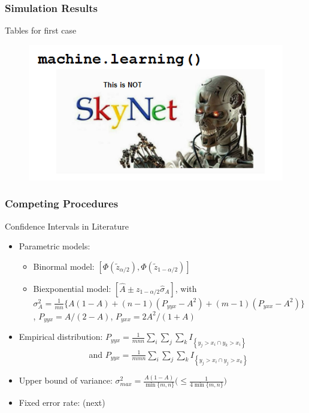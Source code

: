 \documentclass{beamer}
\begin{document}

\begin{frame}
\frametitle{Simulation Results}

Tables for first case
\begin{figure}
    \includegraphics[scale =  0.75 ]{Figs/ThisIsNotSkyNetLogo.png}
\end{figure}

\end{frame}



\begin{frame}
\frametitle{Competing Procedures}

Confidence Intervals in Literature
\begin{itemize}

    \item Parametric models:
    \begin{itemize}
        \item Binormal model: $[\Phi(\tilde{z}_{\alpha/2}), \Phi(\tilde{z}_{1-\alpha/2})]$
        \item Biexponential model: $[\hat{A} \pm  z_{1-\alpha/2} \hat{\sigma}_A]$, with \\
        $\sigma^2_A = \frac{1}{mn} \{ A(1 - A) + (n - 1)(P_{yyx} - A^2) + (m - 1)(P_{yxx} - A^2) \}$, 
        $P_{yyx} = A/(2-A)$, $P_{yxx} = 2A^2/(1+A)$
    \end{itemize}

    \item Empirical distribution: $P_{yyx} = \frac{1}{mnn} \sum_i \sum_j \sum_k I_{\left\{ y_j > x_i \cap y_k > x_i \right\}}$ \\
    $\qquad\qquad\qquad\qquad$ and $P_{yyx} = \frac{1}{mmn} \sum_i \sum_j \sum_k I_{\left\{ y_j > x_i \cap y_j > x_k \right\}}$

    \item Upper bound of variance: $\sigma^2_{max} = \frac{A(1-A)}{\min\{ m, n \}} \big( \leq \frac{1}{4 \min\{ m, n \} } \big) $

    \item Fixed error rate: (next) 

\end{itemize}

\end{frame}
\end{document}
